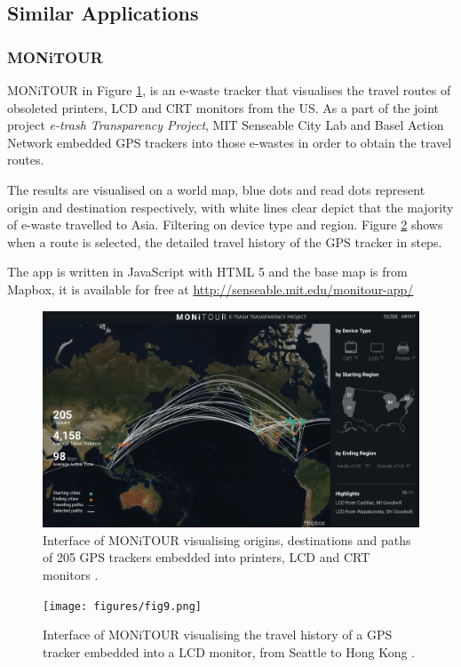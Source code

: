 \documentclass[doc,natbib]{apa6}
\begin{document}
\subsection{Similar Applications}
\subsubsection{MONiTOUR}\label{sec:monitour}\hfil\newline
MONiTOUR \citep{SenseableCityLab-Ewaste} in Figure \ref{fig:8}, is an e-waste tracker that visualises the travel routes of obsoleted printers, LCD and CRT monitors from the US. As a part of the joint project \textit{e-trash Transparency Project}, MIT Senseable City Lab and Basel Action Network embedded GPS trackers into those e-wastes in order to obtain the travel routes. 

The results are visualised on a world map, blue dots and read dots represent origin and destination respectively, with white lines clear depict that the majority of e-waste travelled to Asia. Filtering on device type and region. Figure \ref{fig:9} shows when a route is selected, the detailed travel history of the GPS tracker in steps. 

The app is written in JavaScript with HTML 5 and the base map is from Mapbox, it is available for free at \url{http://senseable.mit.edu/monitour-app/}

\begin{figure}[H]
	\centering
	\includegraphics[width=\textwidth,keepaspectratio]{figures/fig8.png}
	\caption{\label{fig:8}Interface of MONiTOUR visualising origins, destinations and paths of 205 GPS trackers embedded into printers, LCD and CRT monitors \citep{SenseableCityLab-Ewaste}.}
\end{figure}

\begin{figure}[H]
	\centering
	\texttt{[image: figures/fig9.png]}
	\caption{\label{fig:9}Interface of MONiTOUR visualising the travel history of a GPS tracker embedded into a LCD monitor, from Seattle to Hong Kong \citep{SenseableCityLab-Seattle}.}
\end{figure}
\end{document}
